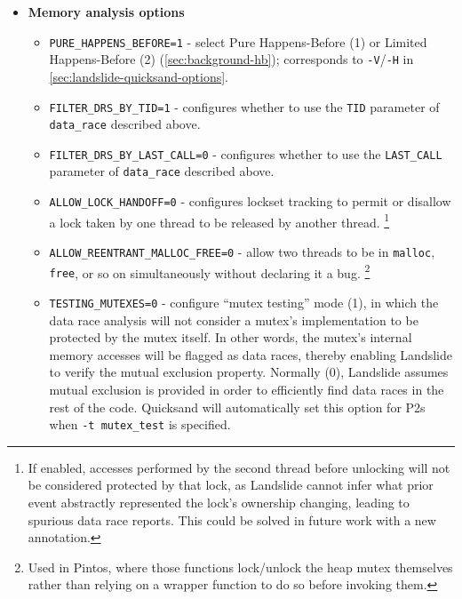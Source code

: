 \begin{itemize}
\item {\bf Memory analysis options}
\begin{itemize}
	\item {\tt PURE\_HAPPENS\_BEFORE=1} - select Pure Happens-Before (1) or Limited Happens-Before (2) (\cref{sec:background-hb});
		corresponds to {\tt -V}/{\tt -H} in \cref{sec:landslide-quicksand-options}.
	\item {\tt FILTER\_DRS\_BY\_TID=1} - configures whether to use the {\tt TID} parameter of {\tt data\_\allowbreak{}race} described above.
	\item {\tt FILTER\_DRS\_BY\_LAST\_CALL=0} - configures whether to use the {\tt LAST\_CALL} parameter of {\tt data\_race} described above.
	\item {\tt ALLOW\_LOCK\_HANDOFF=0} - configures lockset tracking to permit or disallow a lock taken by one thread to be released by another thread.%
		\footnote{If enabled, accesses performed by the second thread before unlocking will not be considered protected by that lock,
			as Landslide cannot infer what prior event abstractly represented the lock's ownership changing,
			leading to spurious data race reports.
			This could be solved in future work with a new annotation.}
	\item {\tt ALLOW\_REENTRANT\_MALLOC\_FREE=0} - allow two threads to be in {\tt malloc}, {\tt free}, or so on simultaneously without declaring it a bug.%
		\footnote{Used in Pintos, where those functions lock/unlock the heap mutex themselves rather than relying on a wrapper function to do so before invoking them.}
	\item {\tt TESTING\_MUTEXES=0} - configure ``mutex testing'' mode (1),
		in which the data race analysis will not consider a mutex's implementation to be protected by the mutex itself.
		In other words, the mutex's internal memory accesses will be flagged as data races,
		thereby enabling Landslide to verify the mutual exclusion property.
		Normally (0), Landslide assumes mutual exclusion is provided in order to efficiently find data races in the rest of the code.
		Quicksand will automatically set this option for P2s when {\tt -t mutex\_test} is specified.
\end{itemize}


\end{itemize}
